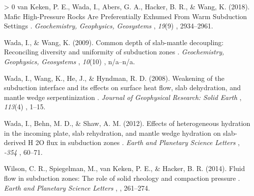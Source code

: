 \documentclass[draft,linenumbers]{agujournal2018} %
\newlength{\cslhangindent} %
\newenvironment{CSLReferences}[3] %
 {%
  \setlength{\parindent}{0pt} %
  \ifodd #1 \everypar{\setlength{\hangindent}{\cslhangindent}}\ignorespaces\fi %
  \ifnum #2 > 0 %
  \setlength{\parskip}{#2\baselineskip} %
  \fi %
 }%
 {} %
\providecommand{\DIFaddtex}[1]{{\protect\color{blue} \sf #1}} %
\providecommand{\DIFaddend}{} %
\providecommand{\DIFadd}[1]{\texorpdfstring{\DIFaddtex{#1}}{#1}} %
\DeclareRobustCommand{\DIFaddend}{\DIFOaddend \let\includegraphics\DIFOincludegraphics} %
\begin{document}
\begin{CSLReferences}{1}{0}
\leavevmode\hypertarget{ref-VanKeken2018}{}%
\DIFadd{van Keken, P. E., Wada, I., Abers, G. A., Hacker, B. R., \& Wang, K.
(2018). }{\DIFadd{Mafic High-Pressure Rocks Are Preferentially Exhumed From Warm
Subduction Settings}}\DIFadd{. }\emph{\DIFadd{Geochemistry, Geophysics, Geosystems}}\DIFadd{,
}\emph{19}(9)\DIFadd{, 2934--2961.
}

\leavevmode\hypertarget{ref-Wada2009}{}%
\DIFadd{Wada, I., \& Wang, K. (2009). }{\DIFadd{Common depth of slab-mantle decoupling:
Reconciling diversity and uniformity of subduction zones}}\DIFadd{.
}\emph{\DIFadd{Geochemistry, Geophysics, Geosystems}}\DIFadd{, }\emph{10}(10)\DIFadd{, n/a--n/a.
}

\leavevmode\hypertarget{ref-Wada2008}{}%
\DIFadd{Wada, I., Wang, K., He, J., \& Hyndman, R. D. (2008). }{\DIFadd{Weakening of the
subduction interface and its effects on surface heat flow, slab
dehydration, and mantle wedge serpentinization}}\DIFadd{. }\emph{\DIFadd{Journal of
Geophysical Research: Solid Earth}}\DIFadd{, }\emph{113}(4)\DIFadd{, 1--15.
}

\leavevmode\hypertarget{ref-Wada2012}{}%
\DIFadd{Wada, I., Behn, M. D., \& Shaw, A. M. (2012). }{\DIFadd{Effects of heterogeneous
hydration in the incoming plate, slab rehydration, and mantle wedge
hydration on slab-derived H 2O flux in subduction zones}}\DIFadd{. }\emph{\DIFadd{Earth
and Planetary Science Letters}}\DIFadd{, }\emph{\DIFadd{353-354}}\DIFadd{, 60--71.
}

\leavevmode\hypertarget{ref-Wilson2014}{}%
\DIFadd{Wilson, C. R., Spiegelman, M., van Keken, P. E., \& Hacker, B. R.
(2014). }{\DIFadd{Fluid flow in subduction zones: The role of solid rheology and
compaction pressure}}\DIFadd{. }\emph{\DIFadd{Earth and Planetary Science Letters}}\DIFadd{,
}\emph{\DIFadd{401}}\DIFadd{, 261--274.
}

\end{CSLReferences}

\DIFaddend 
\end{document}
